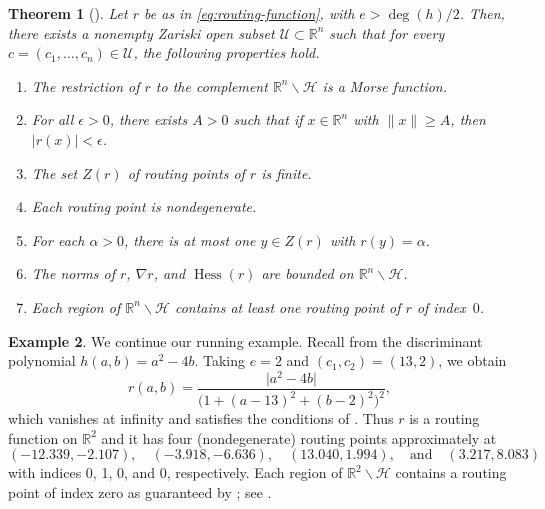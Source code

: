 \documentclass[11pt]{article}
\numberwithin{equation}{section}
\theoremstyle{plain}
\newtheorem{theorem}{Theorem}[section]
\theoremstyle{definition}
\newtheorem{example}[theorem]{Example}
\theoremstyle{remark}
\newcommand{\sH}{{\mathcal H}}
\newcommand\bR{{\mathbb R}}
\DeclareMathOperator*{\Hess}{Hess}
\begin{document}
\begin{theorem}[]
\label{thm:generic_properties_of_routing_functions}
Let $r$ be as in \eqref{eq:routing-function}, with  $e>\deg(h)/2$. Then, there exists a nonempty Zariski open subset $\mathcal{U}\subset\mathbb{R}^n$ such that for every $c=(c_1,\ldots,c_n)\in\mathcal{U}$, the following properties hold.
\begin{enumerate}[itemsep=0pt,parsep=0pt]
    \item The restriction of $r$ to the complement $\bR^n\smallsetminus\sH$ is a Morse function.
    \item For all $\epsilon >0$, there exists $A > 0$ such that if $x\in \bR^{n}$ with $\lVert x\rVert\ge A$, then $\lvert r(x)\rvert < \epsilon$.
    \item The set $Z(r)$ of routing points of $r$ 
    is finite.
    \item Each routing point is nondegenerate.
    \item For each $\alpha >0$,  there is at most one $y\in Z(r)$ with $r(y)=\alpha$.
    \item The norms of $r$, $\nabla r$, and $\Hess(r)$ are bounded on $\bR^{n}\smallsetminus \sH$.
    \item Each region of $\bR^{n}\smallsetminus \sH$ contains at least one routing point of $r$ of index~$0$.
\end{enumerate}
\end{theorem}

\begin{example}\label{Ex: quadratic discriminant4}
We continue our running example. Recall from  the discriminant polynomial 
$h(a,b) = a^{2}-4b$.  
Taking $e=2$ and $(c_{1},c_{2}) = (13,2)$, we obtain 
\begin{equation*}
r(a,b) = \frac{\vert a^{2}-4b\vert }{\big(1+(a - 13)^{2}+(b -2)^{2}\big)^{2}},    
\end{equation*}
which vanishes at infinity and satisfies the conditions of .  
Thus $r$ is a routing function on $\bR^{2}$ and it has four (nondegenerate) routing points approximately at
\begin{equation*}
(-12.339, -2.107),\quad (-3.918, -6.636),\quad (13.040, 1.994),\quad \text{and} \quad (3.217, 8.083) 
\end{equation*}
with indices 0, 1, 0, and 0, respectively. Each region of  $\bR^{2}\smallsetminus \sH$ contains a routing point of index zero as guaranteed by ; see .
\end{example}
\end{document}
